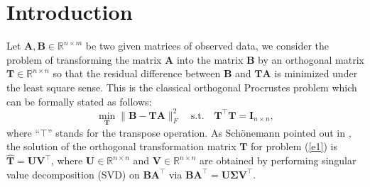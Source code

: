 \documentclass[titlepage,11pt,twoside]{article}
\begin{document}
\section{Introduction}
Let $\mathbf{A},\mathbf{B}\in\mathbb{R}^{n\times m}$ be two given matrices of observed data, we consider the problem of transforming the matrix $\mathbf{A}$ into the matrix $\mathbf{B}$ by an orthogonal matrix $\mathbf{T}\in\mathbb{R}^{n\times n}$ so that the residual difference between $\mathbf{B}$ and $\mathbf{T}\mathbf{A}$ is minimized under the least square sense. This is the classical orthogonal Procrustes problem \cite{procrustesprogram} which can be formally stated as follows:
\begin{equation}\label{e1}
\min_{\mathbf{T}}\|\mathbf{B}-\mathbf{T}\mathbf{A}\|_{F}^{2}
\quad
\text{s.t.}
\quad
\mathbf{T}^{\top}\mathbf{T} = \mathbf{I}_{n\times n},
\end{equation}
where ``$\top$'' stands for the transpose operation. As Sch{\"o}nemann pointed out in \cite{schonemann1966generalized}, the solution of the orthogonal transformation matrix $\mathbf{T}$ for problem (\ref{e1}) is
$\mathbf{\hat{T}}=\mathbf{U}\mathbf{V}^{\top}$, where $\mathbf{U}\in\mathbb{R}^{n\times n}$ and $\mathbf{V}\in\mathbb{R}^{n\times n}$ are obtained by performing singular value decomposition (SVD) on $\mathbf{B}\mathbf{A}^{\top}$ via $\mathbf{B}\mathbf{A}^{\top}=\mathbf{U}\mathbf{\Sigma}\mathbf{V}^{\top}$.
\end{document}
